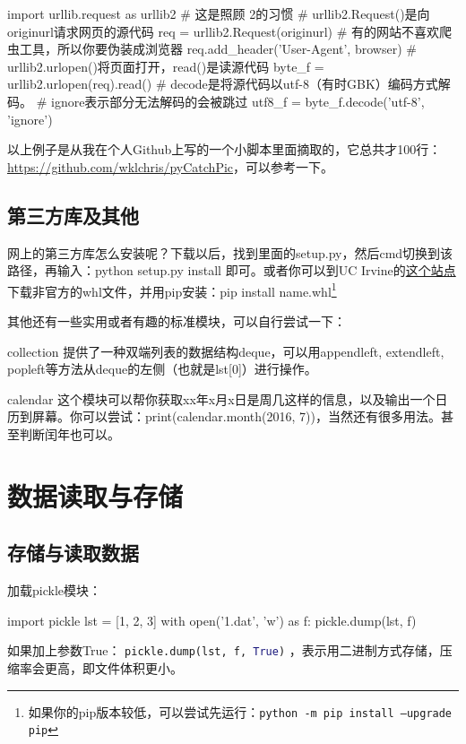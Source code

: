 \documentclass[a4paper,12pt]{report}
\newcommand{\pyline}[1]{{ \lstinline[language=Python, basicstyle=\ttfamily]{#1} }}
\newcommand{\python}{{\ttfamily{Python}}}
\newenvironment{fead}{\begin{description}[font=\bfseries\uline]}
    {\end{description}}
\begin{document}
\begin{py}
import urllib.request as urllib2 # 这是照顾\python{} 2的习惯
# urllib2.Request()是向originurl请求网页的源代码
req = urllib2.Request(originurl)
# 有的网站不喜欢爬虫工具，所以你要伪装成浏览器
req.add_header('User-Agent', browser)
# urllib2.urlopen()将页面打开，read()是读源代码
byte_f = urllib2.urlopen(req).read()
# decode是将源代码以utf-8（有时GBK）编码方式解码。
    # ignore表示部分无法解码的会被跳过
utf8_f = byte_f.decode('utf-8', 'ignore')
\end{py}

以上例子是从我在个人Github上写的一个小脚本里面摘取的，它总共才100行：\url{https://github.com/wklchris/pyCatchPic}，可以参考一下。

\section{第三方库及其他}
网上的第三方库怎么安装呢？下载以后，找到里面的setup.py，然后cmd切换到该路径，再输入：python setup.py install 即可。或者你可以到UC Irvine的\href{http://www.lfd.uci.edu/~gohlke/pythonlibs}{这个站点}下载非官方的whl文件，并用pip安装：pip install name.whl\footnote{如果你的pip版本较低，可以尝试先运行：\texttt{python -m pip install --upgrade pip}}

其他还有一些实用或者有趣的标准模块，可以自行尝试一下：
\begin{fead}
\item[collection] 提供了一种双端列表的数据结构deque，可以用appendleft, extendleft, popleft等方法从deque的左侧（也就是lst[0]）进行操作。
\item[calendar] 这个模块可以帮你获取xx年x月x日是周几这样的信息，以及输出一个日历到屏幕。你可以尝试：print(calendar.month(2016, 7))，当然还有很多用法。甚至判断闰年也可以。
\end{fead}

\chapter{数据读取与存储}
\section{存储与读取数据}
加载pickle模块：
\begin{py}
import pickle
lst = [1, 2, 3]
with open('1.dat', 'w') as f:
    pickle.dump(lst, f)
\end{py}

如果加上参数True：\pyline{pickle.dump(lst, f, True)}，表示用二进制方式存储，压缩率会更高，即文件体积更小。
\end{document}
